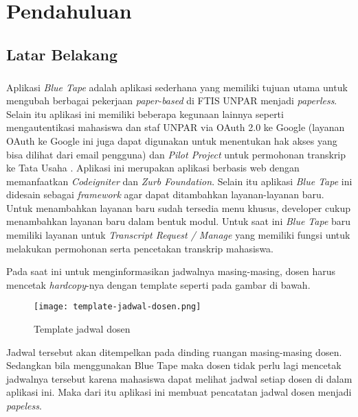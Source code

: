 \chapter{Pendahuluan}
\label{chap:intro}
   
\section{Latar Belakang}
\label{sec:label}

\paragraph{} Aplikasi \textit{Blue Tape} adalah aplikasi sederhana yang memiliki tujuan utama untuk mengubah berbagai pekerjaan \textit{paper-based} di FTIS UNPAR menjadi \textit{paperless}. Selain itu aplikasi ini memiliki beberapa kegunaan lainnya seperti mengautentikasi mahasiswa dan staf UNPAR via OAuth 2.0 ke Google (layanan OAuth ke Google ini juga dapat digunakan untuk menentukan hak akses yang bisa dilihat dari email pengguna) dan \textit{Pilot Project} untuk permohonan transkrip ke Tata Usaha . Aplikasi ini merupakan aplikasi berbasis web dengan memanfaatkan \textit{Codeigniter} dan \textit{Zurb Foundation}. Selain itu aplikasi \textit{Blue Tape} ini didesain sebagai \textit{framework} agar dapat ditambahkan layanan-layanan baru. Untuk menambahkan layanan baru sudah tersedia menu khusus, developer cukup menambahkan layanan baru dalam bentuk modul. Untuk saat ini \textit{Blue Tape} baru memiliki layanan untuk \textit{Transcript Request / Manage} yang memiliki fungsi untuk melakukan permohonan serta pencetakan transkrip mahasiswa.

Pada saat ini untuk menginformasikan jadwalnya masing-masing, dosen harus mencetak \textit{hardcopy}-nya dengan template seperti pada gambar di bawah.

\begin{figure} [ht]
	\centering  
	\texttt{[image: template-jadwal-dosen.png]}  
	\caption[Template jadwal dosen]{Template jadwal dosen} 
	\label{fig:template-jadwal-dosen} 
\end{figure} 
Jadwal tersebut akan ditempelkan pada dinding ruangan masing-masing dosen. Sedangkan bila menggunakan Blue Tape maka dosen tidak perlu lagi mencetak jadwalnya tersebut karena mahasiswa dapat melihat jadwal setiap dosen di dalam aplikasi ini. Maka dari itu aplikasi ini membuat pencatatan jadwal dosen menjadi \textit{papeless}.

